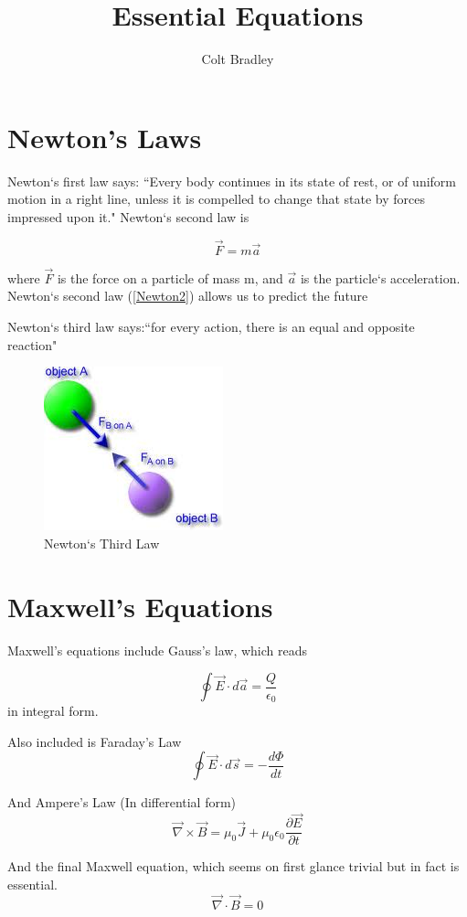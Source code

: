 \documentclass[11pt]{article}
\newcommand\be{\begin{equation}}
\newcommand\ee{\end{equation}}
\begin{document}
\title{Essential Equations}
\date{}
\author{Colt Bradley}
\maketitle


\section{Newton’s Laws}
Newton`s first law says: ``Every body continues in its state
of rest, or of uniform motion in a right line, unless it is
compelled to change that state by forces impressed upon it."
Newton`s second law is

\begin{equation}
\vec F = m \vec a \label{Newton2}
\end{equation}

where $\vec F$ is the force on a particle of mass m, and
$\vec a$ is the particle`s acceleration. Newton`s second law (\ref{Newton2}) allows us to predict the future

Newton`s third law says:``for every action, there is an equal and opposite reaction"

\begin{figure}[ht]
\centering
\includegraphics[scale=.5]{N3L.jpg}
\caption{Newton`s Third Law}
\end{figure}

\section{Maxwell’s Equations}
Maxwell’s equations include Gauss’s law, which reads

\begin{equation}
\oint \vec E \cdot d\vec a = \frac{Q}{\epsilon_0}
\end{equation}
in integral form.


Also included is Faraday's Law
\begin{equation}
\oint \vec E \cdot d\vec s = - \frac{d \Phi}{d t}
\end{equation}

And Ampere's Law (In differential form)
\be
\vec \nabla \times \vec B = \mu_0 \vec J + \mu_0 \epsilon_0 \frac{\partial \vec E}{\partial t}
\ee

And the final Maxwell equation, which seems on first glance trivial but in fact is essential.
\begin{equation}
\vec \nabla \cdot \vec B = 0
\end{equation}
\end{document}
